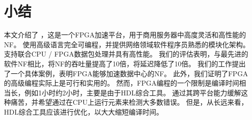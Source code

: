 \section{小结}
\label{clicknp:sec:conclusion}

本文介绍了 \name ，这是一个FPGA加速平台，用于商用服务器中高度灵活和高性能的NF。
\name 使用高级语言完全可编程，并提供网络领域软件程序员熟悉的模块化架构。
\name 支持联合CPU / FPGA数据包处理并具有高性能。
我们的评估表明，与最先进的软件NF相比，\name 将NF的吞吐量提高了10倍，将延迟降低了10倍。
我们的工作提出了一个具体案例，表明FPGA能够加速数据中心的NF。
此外，我们证明了FPGA的高级编程实际上是可行和实用的。
然而，FPGA编程的一个限制是编译时间相当长，例如1小时约2小时，主要是由于HDL综合工具。
\name 通过其跨平台能力缓解这种痛苦，并希望通过在CPU上运行元素来检测大多数错误。
但是，从长远来看，HDL综合工具应该进行优化，以大大缩短编译时间。





